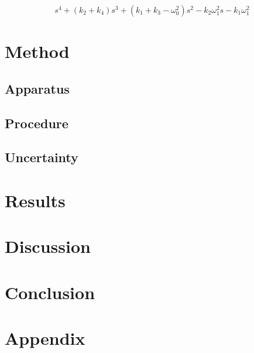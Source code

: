 \documentclass{article}
\begin{document}
\begin{equation}
  s^{4} + \left(k_{2} + k_{4}\right) s^{3} + \left(k_{1} + k_{3} - \omega_{0}^{2}\right) s^{2} -  k_{2} \omega_{1}^{2} s -  k_{1} \omega_{1}^{2}
\end{equation}

\section{Method}

\subsection{Apparatus}


\subsection{Procedure}


\subsection{Uncertainty}



\section{Results}


\section{Discussion}



\section{Conclusion}


\newpage
\section{Appendix}


\newpage
\begin{thebibliography}{9}

\end{thebibliography}
\end{document}
